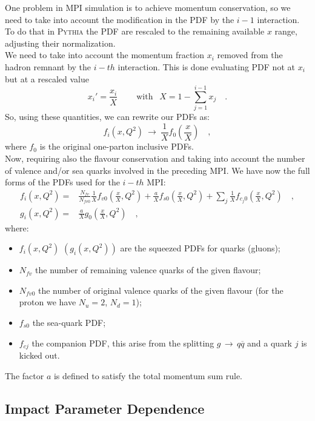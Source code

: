 One problem in MPI simulation is to achieve momentum conservation, so we need to take into account the modification in the PDF by the $i-1$ interaction. To do that in \textsc{Pythia} the PDF are rescaled to the remaining available $x$ range, adjusting their normalization.
\\
We need to take into account the momentum fraction $x_i$ removed from the hadron remnant by the $i-th$ interaction. This is done evaluating PDF not at $x_i$ but at a rescaled value
\begin{equation}
	x_i'=\frac{x_i}{X} \qquad \ \text{with }\ \ X=1-\sum_{j=1}^{i-1}x_j\quad .
\end{equation}
So, using these quantities, we can rewrite our PDFs as:
\begin{equation}
	f_i(x,Q^2)\ \longrightarrow\ \frac{1}{X}f_0\left(\frac{x}{X}\right)\quad ,
\end{equation}
where $f_0$ is the original one-parton inclusive PDFs.
\\
Now, requiring also the flavour conservation and taking into account the number of valence and/or sea quarks involved in the preceding MPI. We have now the full forms of the PDFs used for the $i-th$ MPI:
\begin{align}
f_i(x,Q^2) =&  \frac{N_{fv}}{N_{fv0}}\frac{1}{X} f_{v0}\left( \frac{x}{X},Q^2 \right) + \frac{a}{X}f_{s0}\left( \frac{x}{X},Q^2 \right)+\displaystyle\sum_j \frac{1}{X} f_{c_j0}\left( \frac{x}{X},Q^2 \right) \quad,\\
g_i(x,Q^2) =& \frac{a}{X}g_0\left( \frac{x}{X},Q^2 \right)\quad, 
\end{align}
where: 
\begin{itemize}
	\item $f_i(x,Q^2)$ $(g_i(x,Q^2))$ are the squeezed PDFs for quarks (gluons);
	\item $N_{fv}$ the number of remaining valence quarks of the given flavour;
	\item $N_{fv0}$ the number of original valence quarks of the given flavour (for the proton we have $N_u=2$, $N_d=1$);
	\item $f_{s0}$ the sea-quark PDF;
	\item $f_{cj}$ the companion PDF, this arise from the splitting $g\,\rightarrow\,q\overline{q}$ and a quark $j$ is kicked out.
\end{itemize}
The factor $a$ is defined to satisfy the total momentum sum rule.

\subsection{Impact Parameter Dependence}

